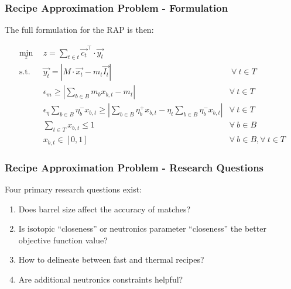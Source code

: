 \begin{frame}[ctb!]
  \frametitle{Recipe Approximation Problem - Formulation}

  The full formulation for the RAP is then:

  \begin{subequations}\label{eqs:rap}
    \begin{align}
      \min_{z} \:\: & 
      z = \sum_{t \in t} \vec{c_{t}}^{\top} \cdot \vec{y_{t}}
      & \label{eqs:rap_obj} \\
      \text{s.t.} \:\: &
      \vec{y_{t}} = \left| M \cdot \vec{x_{t}}  - m_t \vec{I_{t}} \right|
      &
      \: \forall \: t \in T \label{eqs:rap_iso} \\
      &
      \epsilon_{m} \geq \left| \sum_{b \in B} m_{b} x_{b, t} - m_{t} \right|
      & 
      \forall \: t \in T \label{eqs:rap_mass} \\
      &
      \epsilon_{\eta} \sum_{b \in B} \eta_{b}^{-} x_{b, t} \geq 
      \left| \sum_{b \in B} \eta_{b}^{+} x_{b, t} - 
      \eta_{t} \sum_{b \in B} \eta_{b}^{-} x_{b, t} \right|
      & 
      \forall \: t \in T \label{eqs:rap_eta} \\
      &
      \sum_{t \in T} x_{b, t} \leq 1
      & 
      \forall \: b \in B \label{eqs:rap_conserv} \\
      &
      x_{b, t} \in \left[ 0, 1 \right]
      & 
      \forall \: b \in B, \forall \: t \in T  \label{eqs:rap_x}
    \end{align}
  \end{subequations}
\end{frame}

\begin{frame}[ctb!]
  \frametitle{Recipe Approximation Problem - Research Questions} 

  Four primary research questions exist:

  \begin{enumerate}
    \item Does barrel size affect the accuracy of matches?
    \item Is isotopic ``closeness'' or neutronics parameter ``closeness'' the
      better objective function value?
    \item How to delineate between fast and thermal recipes?
    \item Are additional neutronics constraints helpful?
  \end{enumerate}
\end{frame}

